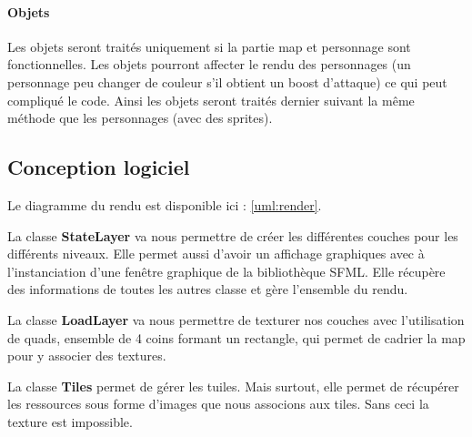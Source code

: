 \documentclass[a4paper,12pt]{article}
\begin{document}
\paragraph{Objets}
Les objets seront traités uniquement si la partie map et personnage sont fonctionnelles. Les objets pourront affecter le rendu des personnages (un personnage peu changer de couleur s'il obtient un boost d'attaque) ce qui peut compliqué le code. Ainsi les objets seront traités dernier suivant la même méthode que les personnages (avec des sprites).



\subsection{Conception logiciel}
Le diagramme du rendu est disponible ici : \ref{uml:render}.\\
\par
La classe \textbf{StateLayer} va nous permettre de créer les différentes couches pour les différents niveaux. Elle permet aussi d'avoir un affichage graphiques avec à l'instanciation d'une fenêtre graphique de la bibliothèque SFML. Elle récupère des informations de toutes les autres classe et gère l'ensemble du rendu.\\
\par
La classe \textbf{LoadLayer} va nous permettre de texturer nos couches avec l'utilisation de quads, ensemble de 4 coins formant un rectangle, qui permet de cadrier la map pour y associer des textures.\\
\par
La classe \textbf{Tiles} permet de gérer les tuiles. Mais surtout, elle permet de récupérer les ressources sous forme d'images que nous associons aux tiles. Sans ceci la texture est impossible.\\
\end{document}
